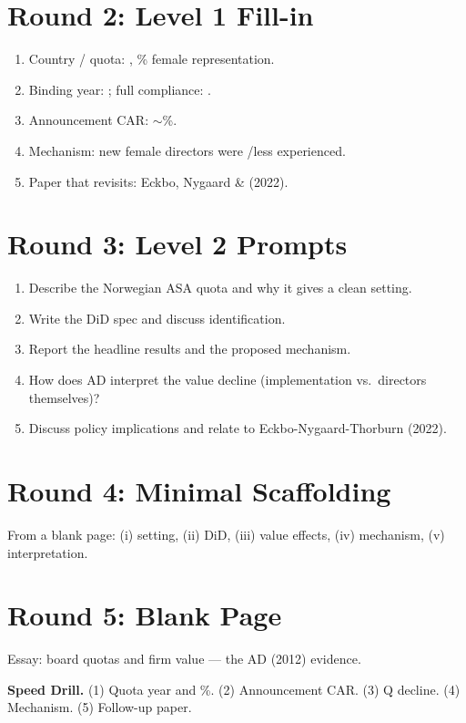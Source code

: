 \documentclass[11pt]{article}
\newcommand{\blank}[1]{\underline{\hspace{#1}}}
\begin{document}
\section*{Round 2: Level 1 Fill-in}
\begin{enumerate}
\item Country / quota: \blank{1.5cm}, \blank{1cm}\% female representation.
\item Binding year: \blank{1cm}; full compliance: \blank{1cm}.
\item Announcement CAR: $\sim$\blank{1cm}\%.
\item Mechanism: new female directors were \blank{1.5cm}/less experienced.
\item Paper that revisits: Eckbo, Nygaard \& \blank{2cm} (2022).
\end{enumerate}

\section*{Round 3: Level 2 Prompts}
\begin{enumerate}
\item Describe the Norwegian ASA quota and why it gives a clean setting.
\item Write the DiD spec and discuss identification.
\item Report the headline results and the proposed mechanism.
\item How does AD interpret the value decline (implementation vs.\ directors themselves)?
\item Discuss policy implications and relate to Eckbo-Nygaard-Thorburn (2022).
\end{enumerate}

\section*{Round 4: Minimal Scaffolding}
From a blank page: (i) setting, (ii) DiD, (iii) value effects, (iv) mechanism, (v) interpretation.

\section*{Round 5: Blank Page}
Essay: board quotas and firm value --- the AD (2012) evidence.

\vspace{6pt}
\begin{drillbox}
\textbf{Speed Drill.} (1) Quota year and \%. (2) Announcement CAR. (3) Q decline. (4) Mechanism. (5) Follow-up paper.
\end{drillbox}
\end{document}
